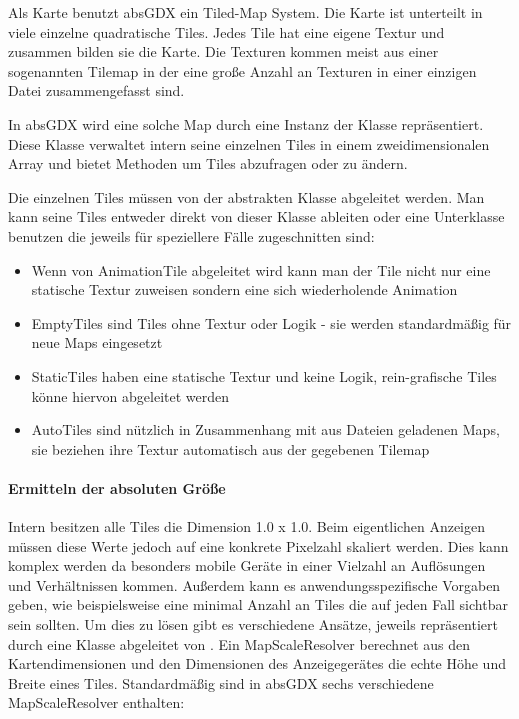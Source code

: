 	
Als Karte benutzt absGDX ein Tiled-Map System. Die Karte ist unterteilt in viele einzelne quadratische Tiles.
Jedes Tile hat eine eigene Textur und zusammen bilden sie die Karte. Die Texturen kommen meist aus einer sogenannten Tilemap in der eine große Anzahl an Texturen in einer einzigen Datei zusammengefasst sind.


In absGDX wird eine solche Map durch eine Instanz der Klasse  repräsentiert. Diese Klasse verwaltet intern seine einzelnen Tiles in einem zweidimensionalen Array und bietet Methoden um Tiles abzufragen oder zu ändern.

Die einzelnen Tiles müssen von der abstrakten Klasse  abgeleitet werden. Man kann seine Tiles entweder direkt von dieser Klasse ableiten oder eine Unterklasse benutzen die jeweils für speziellere Fälle zugeschnitten sind:

\begin{itemize}
  \item {} Wenn von AnimationTile abgeleitet wird kann man der Tile nicht nur eine statische Textur zuweisen sondern eine sich wiederholende Animation
  \item {} EmptyTiles sind Tiles ohne Textur oder Logik - sie werden standardmäßig für neue Maps eingesetzt
  \item {} StaticTiles haben eine statische Textur und	keine Logik, rein-grafische Tiles könne hiervon abgeleitet werden
  \item {} AutoTiles sind nützlich in Zusammenhang mit aus Dateien geladenen Maps, sie beziehen ihre Textur automatisch aus der gegebenen Tilemap
\end{itemize}

\paragraph{Ermitteln der absoluten Größe}

Intern besitzen alle Tiles die Dimension 1.0 x 1.0. Beim eigentlichen Anzeigen müssen diese Werte jedoch auf eine konkrete Pixelzahl skaliert werden. Dies kann komplex werden da besonders mobile Geräte in einer Vielzahl an Auflösungen und Verhältnissen kommen. Außerdem kann es anwendungsspezifische Vorgaben geben, wie beispielsweise eine minimal Anzahl an Tiles die auf jeden Fall sichtbar sein sollten.
Um dies zu lösen gibt es verschiedene Ansätze, jeweils repräsentiert durch eine Klasse abgeleitet von .
Ein MapScaleResolver berechnet aus den Kartendimensionen und den Dimensionen des Anzeigegerätes die echte Höhe und Breite eines Tiles.
Standardmäßig sind in absGDX sechs verschiedene MapScaleResolver enthalten:

